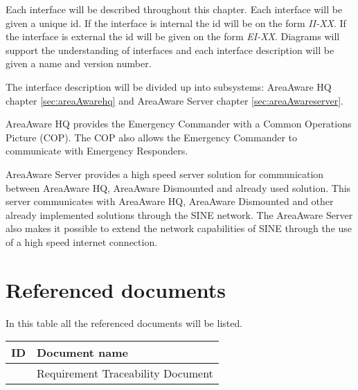 Each interface will be described throughout this chapter. Each interface will be given a unique id. If the interface is internal the id will be on the form \emph{II-XX}. If the interface is external the id will be given on the form \emph{EI-XX}. Diagrams will support the understanding of interfaces and each interface description will be given a name and version number.

The interface description will be divided up into subsystems: AreaAware HQ chapter \ref{sec:areaAwarehq} and AreaAware Server chapter \ref{sec:areaAwareserver}.

AreaAware HQ provides the Emergency Commander with a Common Operations Picture (COP). The COP also allows the Emergency Commander to communicate with Emergency Responders.

AreaAware Server provides a high speed server solution for communication between AreaAware HQ, AreaAware Dismounted and already used solution. This server communicates with AreaAware HQ, AreaAware Dismounted and other already implemented solutions through the SINE network. The AreaAware Server also makes it possible to extend the network capabilities of SINE through the use of a high speed internet connection.

\section{Referenced documents}
In this table all the referenced documents will be listed. \\

\begin{tabular}{b{6cm} b{7cm}}
	\textbf{ID} & \textbf{Document name} \\
	\hline
	\rtm & Requirement Traceability Document \\
\end{tabular}